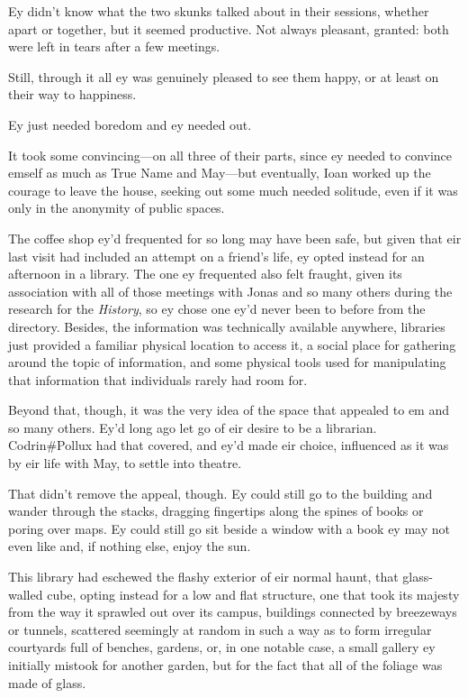 Ey didn't know what the two skunks talked about in their sessions, whether apart or together, but it seemed productive. Not always pleasant, granted: both were left in tears after a few meetings.

Still, through it all ey was genuinely pleased to see them happy, or at least on their way to happiness.

Ey just needed boredom and ey needed out.

It took some convincing—on all three of their parts, since ey needed to convince emself as much as True Name and May—but eventually, Ioan worked up the courage to leave the house, seeking out some much needed solitude, even if it was only in the anonymity of public spaces.

The coffee shop ey'd frequented for so long may have been safe, but given that eir last visit had included an attempt on a friend's life, ey opted instead for an afternoon in a library. The one ey frequented also felt fraught, given its association with all of those meetings with Jonas and so many others during the research for the \emph{History}, so ey chose one ey'd never been to before from the directory. Besides, the information was technically available anywhere, libraries just provided a familiar physical location to access it, a social place for gathering around the topic of information, and some physical tools used for manipulating that information that individuals rarely had room for.

Beyond that, though, it was the very idea of the space that appealed to em and so many others. Ey'd long ago let go of eir desire to be a librarian. Codrin\#Pollux had that covered, and ey'd made eir choice, influenced as it was by eir life with May, to settle into theatre.

That didn't remove the appeal, though. Ey could still go to the building and wander through the stacks, dragging fingertips along the spines of books or poring over maps. Ey could still go sit beside a window with a book ey may not even like and, if nothing else, enjoy the sun.

This library had eschewed the flashy exterior of eir normal haunt, that glass-walled cube, opting instead for a low and flat structure, one that took its majesty from the way it sprawled out over its campus, buildings connected by breezeways or tunnels, scattered seemingly at random in such a way as to form irregular courtyards full of benches, gardens, or, in one notable case, a small gallery ey initially mistook for another garden, but for the fact that all of the foliage was made of glass.

